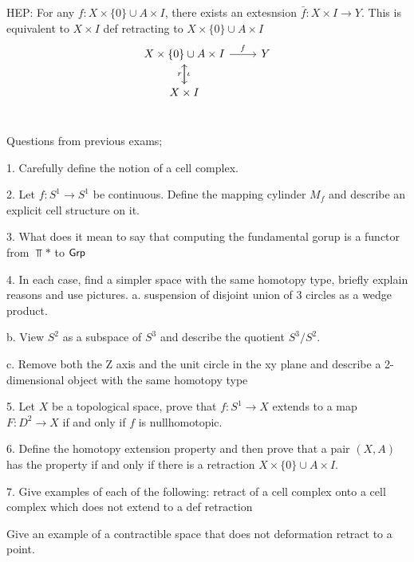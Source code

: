 \documentclass[x11names,reqno,14pt]{extarticle}
\begin{document}
HEP: For any $f:X\times\{0\}\cup A\times I$, there exists an extesnsion $\bar{f}:X\times I \to Y$. This is equivalent to $X\times I$ def retracting to $X\times\{0\}\cup A\times I$
\[
\begin{tikzcd}
X\times\{0\}\cup A\times I \ar[d, "\iota"] \ar[r, "f"] & Y \\
X\times I \ar[u, "r"] \\ & 
\end{tikzcd}
\]

Questions from previous exams;

1. Carefully define the notion of a cell complex. 

2. Let $f:S^1\to S^1$ be continuous. Define the mapping cylinder $M_f$ and describe an explicit cell structure on it. 

3. What does it mean to say that computing the fundamental gorup is a functor from $\Top*$ to ${{\text{\sffamily {Grp}}}}$

4. In each case, find a simpler space with the same homotopy type, briefly explain reasons and use pictures. 
	a. suspension of disjoint union of 3 circles as a wedge product. 

	b. View $S^2$ as a subspace of $S^3$ and describe the quotient $S^3/S^2$. 

	c. Remove both the Z axis and the unit circle in the xy plane and describe a 2-dimensional object with the same homotopy type

5. Let $X$ be a topological space, prove that $f:S^1\to X$ extends to a map $F:D^2\to X$ if and only if $f$ is nullhomotopic. 

6. Define the homotopy extension property and then prove that a pair $(X, A)$ has the property if and only if there is a retraction $X\times\{0\}\cup A\times I$. 

7. Give examples of each of the following:
		retract of a cell complex onto a cell complex which does not extend to a def retraction

		Give an example of a contractible space that does not deformation retract to a point. 
\end{document}

